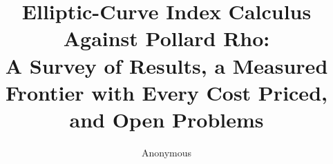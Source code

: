 \documentclass[10pt,a4paper]{article}
\title{Elliptic-Curve Index Calculus Against Pollard Rho:\\[4pt]
       {\large A Survey of Results, a Measured Frontier with Every Cost Priced,\\
       and Open Problems}}
\author{Anonymous}
\date{}
\theoremstyle{remark}
\theoremstyle{definition}
\begin{document}
\maketitle

\begin{abstract}

\end{abstract}

\tableofcontents
\bigskip

















\appendix







\end{document}
